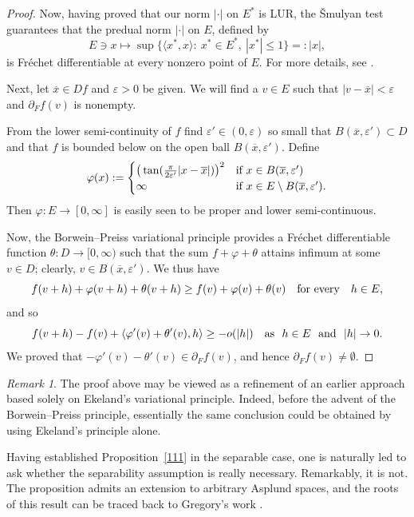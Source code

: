 \documentclass[12pt]{amsart}
\theoremstyle{plain}
\theoremstyle{definition}
\theoremstyle{remark}
\newtheorem{remark}[theorem]{Remark}
\def\ee{\varepsilon}
\def\xx{\overline x}
\def\vv{\varphi}
\def\ee{\varepsilon}
\def\ee{\varepsilon}
\begin{document}
\begin{proof}
Now, having proved that our norm $|\cdot|$ on $E^*$ is LUR, the \v Smulyan test guarantees that the predual norm $|\cdot|$ on $E$, defined by
$$
E\ni x\longmapsto\sup\big\{\langle x^*,x\rangle:\ x^*\in E^*,\ |x^*|\le1\big\}=:|x|,
$$
is Fr\'echet differentiable at every nonzero point of $E$. For more details, see \cite[p. 43]{dgz}.

Next, let $\overline x\in Df$ and $\ee>0$ be given. We will find a $v\in E$ such that
$|v-\overline x|<\ee$ and $\partial_F f(v)$ is nonempty.

From the lower semi-continuity of $f$ find $\ee'\in(0,\ee)$ so small that $B(\overline x,\ee')\subset D$
and that $f$ is bounded below on the open ball
$B(\overline x,\ee')$. Define
\begin{eqnarray*}
\vv(x):=\begin{cases}
          \big(\tan(\hbox{$\frac\pi{2\ee'}$} |x-\overline x|)\big)^2 & \text{if $x\in B(\xx,\ee')$}\\
          \infty & \text{if $x\in E\setminus B(\xx,\ee')$}.
        \end{cases}
\end{eqnarray*}
Then $\vv:E\longrightarrow[0,\infty]$ is easily seen to be proper and lower semi-continuous.

Now, the Borwein--Preiss variational principle \cite[Theorem 4.20]{p} provides a Fr\'echet differentiable function
$\theta: D\longrightarrow[0,\infty)$ such that the sum $f+\vv+\theta$ attains infimum at some $v\in D$; clearly,
$v\in B(\xx,\ee')$. We thus have
$$
f(v+h)+\vv(v+h)+\theta(v+h) \ge f(v)+\vv(v)+\theta(v)\quad{\rm for\ every}\quad h\in E,
$$
and so
$$
f(v+h)-f(v)+\langle \vv'(v)+\theta'(v),h\rangle \ge -o(|h|)\quad{\rm as}\ \ h\in E\ \ {\rm and}\  \ |h|\to0.
$$
We proved that $-\vv'(v)-\theta'(v)\in \partial_F f(v)$, and hence $\partial_F f(v)\neq\emptyset$.
\end{proof}
\begin{remark}
The proof above may be viewed as a refinement of an earlier approach based solely on Ekeland's variational principle. Indeed, before the advent of the Borwein--Preiss principle, essentially the same conclusion could be obtained by using Ekeland's principle alone.
\end{remark}
Having established Proposition~\ref{111} in the separable case, one is naturally led to ask whether the separability assumption is really necessary. Remarkably, it is not. The proposition admits an extension to arbitrary Asplund spaces, and the roots of this result can be traced back to Gregory's work \cite[Theorem~2.14]{p}.
\end{document}
